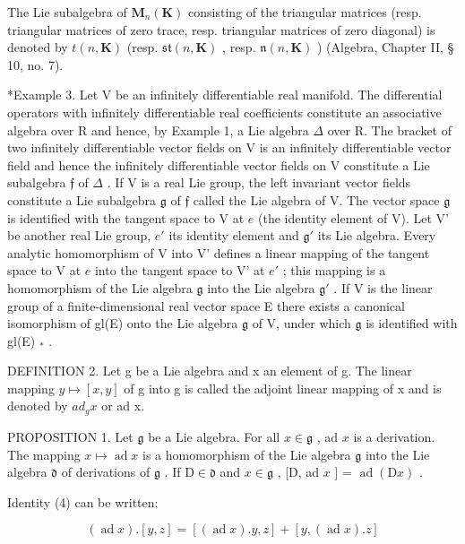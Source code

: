 The Lie subalgebra of \(\mathbf{M}_{n}(\mathbf{K})\) consisting of the triangular matrices (resp. triangular matrices of zero trace, resp. triangular matrices of zero diagonal) is denoted by \(t(n,\mathbf{K})\) (resp. \(\mathfrak{st}(n,\mathbf{K})\) , resp. \(\mathfrak{n}(n,\mathbf{K})\) ) (Algebra, Chapter II, § 10, no. 7).

*Example 3. Let V be an infinitely differentiable real manifold. The differential operators with infinitely differentiable real coefficients constitute an associative algebra over R and hence, by Example 1, a Lie algebra \(\Delta\) over R. The bracket of two infinitely differentiable vector fields on V is an infinitely differentiable vector field and hence the infinitely differentiable vector fields on V constitute a Lie subalgebra \(\mathfrak{f}\) of \(\Delta\) . If V is a real Lie group, the left invariant vector fields constitute a Lie subalgebra \(\mathfrak{g}\) of \(\mathfrak{f}\) called the Lie algebra of V. The vector space \(\mathfrak{g}\) is identified with the tangent space to V at \(e\) (the identity element of V). Let V' be another real Lie group, \(e'\) its identity element and \(\mathfrak{g}'\) its Lie algebra. Every analytic homomorphism of V into V' defines a linear mapping of the tangent space to V at \(e\) into the tangent space to V' at \(e'\) ; this mapping is a homomorphism of the Lie algebra \(\mathfrak{g}\) into the Lie algebra \(\mathfrak{g}'\) . If V is the linear group of a finite-dimensional real vector space E there exists a canonical isomorphism of gl(E) onto the Lie algebra \(\mathfrak{g}\) of V, under which \(\mathfrak{g}\) is identified with gl(E) \(_*\) .

DEFINITION 2. Let g be a Lie algebra and x an element of g. The linear mapping \(y \mapsto [x, y]\) of g into g is called the adjoint linear mapping of x and is denoted by \(ad_{g}x\) or ad x.

PROPOSITION 1. Let \(\mathfrak{g}\) be a Lie algebra. For all \(x \in \mathfrak{g}\) , ad \(x\) is a derivation. The mapping \(x \mapsto \operatorname{ad} x\) is a homomorphism of the Lie algebra \(\mathfrak{g}\) into the Lie algebra \(\mathfrak{d}\) of derivations of \(\mathfrak{g}\) . If \(\mathrm{D} \in \mathfrak{d}\) and \(x \in \mathfrak{g}\) , {[}D, ad \(x\) {]} = \(\operatorname{ad}(\mathrm{D}x)\) .

Identity (4) can be written:

\[
(\operatorname{ad} x). [ y, z ] = [ (\operatorname{ad} x). y, z ] + [ y, (\operatorname{ad} x). z ]
\]

